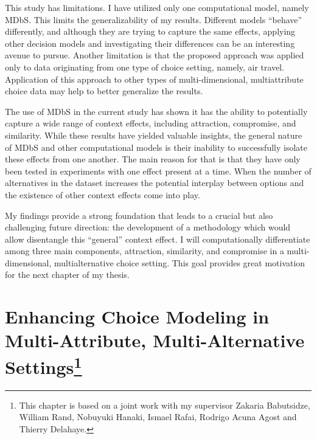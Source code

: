 \documentclass[a4paper,12pt]{article}
\begin{document}
This study has limitations. I have utilized only one computational model, namely MDbS. This limits the generalizability of my results. Different models ``behave'' differently, and although they are trying to capture the same effects, applying other decision models and investigating their differences can be an interesting avenue to pursue. Another limitation is that the proposed approach was applied only to data originating from one type of choice setting, namely, air travel. Application of this approach to other types of multi-dimensional, multiattribute choice data may help to better generalize the results.

The use of MDbS in the current study has shown it has the ability to potentially capture a wide range of context effects, including attraction, compromise, and similarity. While these results have yielded valuable insights, the general nature of MDbS and other computational models is their inability to successfully isolate these effects from one another. The main reason for that is that they have only been tested in experiments with one effect present at a time. When the number of alternatives in the dataset increases the potential interplay between options and the existence of other context effects come into play. 

My findings provide a strong foundation that leads to a crucial but also challenging future direction: the development of a methodology which would allow disentangle this ``general'' context effect. I will computationally differentiate among three main components, attraction, similarity, and compromise in a multi-dimensional, multialternative choice setting. This goal provides great motivation for the next chapter of my thesis.

\newpage

\section{Enhancing Choice Modeling in Multi-Attribute, Multi-Alternative Settings\footnote{This chapter is based on a joint work with my supervisor Zakaria Babutsidze, William Rand, Nobuyuki Hanaki, Ismael Rafai, Rodrigo Acuna Agost and Thierry Delahaye.}}\label{chapter:jmrPaper} 
\end{document}
